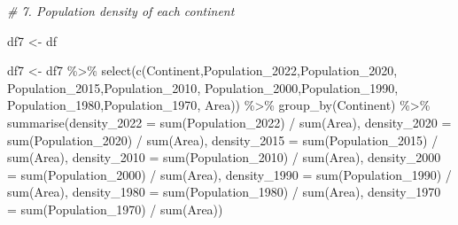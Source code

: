 \documentclass[
]{article}
\newenvironment{Shaded}{\begin{snugshade}}{\end{snugshade}}
\newcommand{\AttributeTok}[1]{\textcolor[rgb]{0.77,0.63,0.00}{#1}}
\newcommand{\CommentTok}[1]{\textcolor[rgb]{0.56,0.35,0.01}{\textit{#1}}}
\newcommand{\FunctionTok}[1]{\textcolor[rgb]{0.00,0.00,0.00}{#1}}
\newcommand{\NormalTok}[1]{#1}
\newcommand{\OtherTok}[1]{\textcolor[rgb]{0.56,0.35,0.01}{#1}}
\newcommand{\SpecialCharTok}[1]{\textcolor[rgb]{0.00,0.00,0.00}{#1}}
\newcommand{\StringTok}[1]{\textcolor[rgb]{0.31,0.60,0.02}{#1}}
\begin{document}
\begin{Shaded}
\begin{Highlighting}[]
\CommentTok{\# 7. Population density of each continent}

\NormalTok{df7 }\OtherTok{\textless{}{-}}\NormalTok{ df}

\NormalTok{df7 }\OtherTok{\textless{}{-}}\NormalTok{ df7 }\SpecialCharTok{\%\textgreater{}\%} \FunctionTok{select}\NormalTok{(}\FunctionTok{c}\NormalTok{(}\StringTok{\textquotesingle{}Continent\textquotesingle{}}\NormalTok{,}\StringTok{\textquotesingle{}Population\_2022\textquotesingle{}}\NormalTok{,}\StringTok{\textquotesingle{}Population\_2020\textquotesingle{}}\NormalTok{,}
                       \StringTok{\textquotesingle{}Population\_2015\textquotesingle{}}\NormalTok{,}\StringTok{\textquotesingle{}Population\_2010\textquotesingle{}}\NormalTok{,}
                      \StringTok{\textquotesingle{}Population\_2000\textquotesingle{}}\NormalTok{,}\StringTok{\textquotesingle{}Population\_1990\textquotesingle{}}\NormalTok{,}
                      \StringTok{\textquotesingle{}Population\_1980\textquotesingle{}}\NormalTok{,}\StringTok{\textquotesingle{}Population\_1970\textquotesingle{}}\NormalTok{, }\StringTok{\textquotesingle{}Area\textquotesingle{}}\NormalTok{)) }\SpecialCharTok{\%\textgreater{}\%} \FunctionTok{group\_by}\NormalTok{(Continent) }\SpecialCharTok{\%\textgreater{}\%}
  \FunctionTok{summarise}\NormalTok{(}\AttributeTok{density\_2022 =} \FunctionTok{sum}\NormalTok{(Population\_2022) }\SpecialCharTok{/} \FunctionTok{sum}\NormalTok{(Area),}
            \AttributeTok{density\_2020 =} \FunctionTok{sum}\NormalTok{(Population\_2020) }\SpecialCharTok{/} \FunctionTok{sum}\NormalTok{(Area),}
            \AttributeTok{density\_2015 =} \FunctionTok{sum}\NormalTok{(Population\_2015) }\SpecialCharTok{/} \FunctionTok{sum}\NormalTok{(Area),}
            \AttributeTok{density\_2010 =} \FunctionTok{sum}\NormalTok{(Population\_2010) }\SpecialCharTok{/} \FunctionTok{sum}\NormalTok{(Area),}
            \AttributeTok{density\_2000 =} \FunctionTok{sum}\NormalTok{(Population\_2000) }\SpecialCharTok{/} \FunctionTok{sum}\NormalTok{(Area),}
            \AttributeTok{density\_1990 =} \FunctionTok{sum}\NormalTok{(Population\_1990) }\SpecialCharTok{/} \FunctionTok{sum}\NormalTok{(Area),}
            \AttributeTok{density\_1980 =} \FunctionTok{sum}\NormalTok{(Population\_1980) }\SpecialCharTok{/} \FunctionTok{sum}\NormalTok{(Area),}
            \AttributeTok{density\_1970 =} \FunctionTok{sum}\NormalTok{(Population\_1970) }\SpecialCharTok{/} \FunctionTok{sum}\NormalTok{(Area))}


\end{Highlighting}
\end{Shaded}
\end{document}
